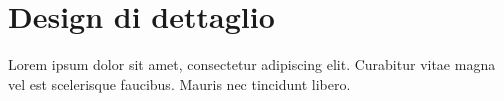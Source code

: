 \chapter{Design di dettaglio}
Lorem ipsum dolor sit amet, consectetur adipiscing elit. Curabitur vitae magna
vel est scelerisque faucibus. Mauris nec tincidunt libero.
